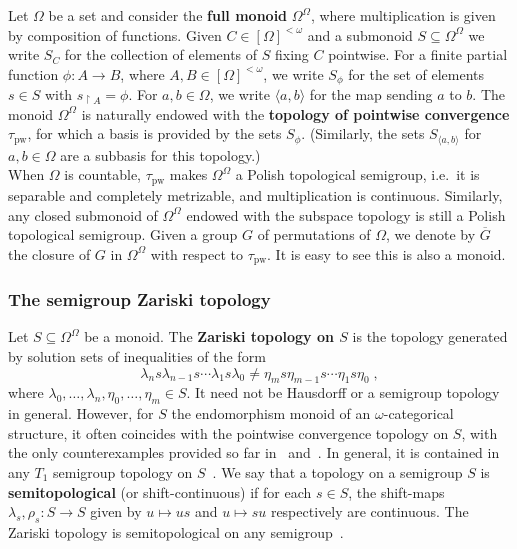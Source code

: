 \documentclass{article}
\theoremstyle{remark}
\theoremstyle{definition}
\newcommand{\nn}[0]{S}%
\newcommand{\pw}[0]{\tau_{\mathrm{pw}}}
\newcommand{\fps}[1]{[#1]^{<\omega}}
\begin{document}
{{{{Let $\Omega$ be a set and consider the \textbf{full monoid} $\Omega^\Omega$, where multiplication is given by composition of functions.
Given $C\in\fps{\Omega}$ and a submonoid $S\subseteq\Omega^{\Omega}$ we write $\nn_{C}$ for the collection of elements of {$S$}
fixing $C$ pointwise. For a {finite}  partial function $\phi\colon A\to B$, where  {$A,B\in[\Omega]^{<\omega}$}, we write $\nn_{\phi}$ for the set of elements 
$s\in S$ with $s_{\restriction A}=\phi$. {For $a,b\in\Omega$, we write $\langle a, b\rangle$ for the map sending $a$ to $b$.} The monoid $\Omega^\Omega$ is naturally endowed with the \textbf{topology of pointwise convergence} $\pw$, for which a basis is provided by the sets $S_\phi$. {(Similarly, the sets $S_{\langle a, b\rangle}$ for $a,b\in\Omega$ are a subbasis for this topology.)} \\



When $\Omega$ is countable, $\pw$ makes   $\Omega^\Omega$ a Polish topological semigroup, i.e.~it is separable and completely metrizable, and multiplication is continuous. Similarly, any closed submonoid of $\Omega^\Omega$ endowed with the subspace topology is still a Polish topological semigroup. %
Given a group $G$ of permutations of $\Omega$, we denote by $\overline{G}$ the closure of $G$ in $\Omega^\Omega$ with respect to $\pw$. It is easy to see this is also a monoid.



\subsubsection{The semigroup Zariski topology}
Let $S\subseteq \Omega^\Omega$ be a monoid. The \textbf{Zariski  topology on $S$} is the topology generated by solution sets of inequalities of the form
\begin{equation}\label{eq:inequality}
    \lambda_{n} s \lambda_{n-1}s\cdots \lambda_1 s \lambda_0\neq \eta_{m} s \eta_{m-1} s \cdots \eta_1 s \eta_0\;,
\end{equation}
 where $\lambda_0, \dots, \lambda_n,\eta_0,\dots, \eta_m\in S$. It need not be Hausdorff or a semigroup topology in general. However, for $S$ the endomorphism monoid of an $\omega$-categorical structure, it often coincides with the pointwise convergence topology on $S$, with the {only counterexamples provided so far in~\cite{pinskerschindler} and~\cite{marimon2025guide}.}
 In general, it is contained in any $T_1$ semigroup topology on $S$~\cite[Proposition 2.1]{elliott2023automatic}. We say that a topology on a semigroup $S$ is \textbf{semitopological} (or shift-continuous) if for each $s\in S$, the shift-maps $\lambda_s, \rho_s: S\to S$ given by $u\mapsto us$ and $u\mapsto su$ respectively are continuous. The Zariski topology is semitopological on any semigroup~\cite[Proposition 2.2]{elliott2023automatic}.
 
}}}}
\end{document}

